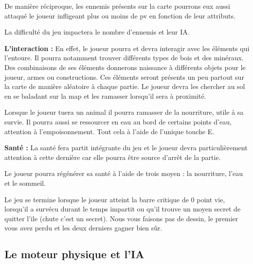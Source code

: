 \documentclass{article}
\begin{document}
\par
 De manière réciproque, les ennemis présents sur la carte pourrons eux aussi attaqué le joueur infligeant plus ou moins de pv en fonction de leur attributs.
\newline

\par 
La difficulté du jeu impactera le nombre d'ennemis et leur IA.
\newline
\newline
\newline
\newline
\par
\textbf{L'interaction :} En effet, le joueur pourra et devra interagir avec les éléments qui l'entoure. Il pourra notamment trouver différents types de bois et des minéraux. Des combinaisons de ses éléments donnerons naissance à différents objets pour le joueur, armes ou constructions. Ces éléments seront présents un peu partout sur la carte de manière aléatoire à chaque partie. Le joueur devra les chercher au sol en se baladant sur la map et les ramasser lorsqu'il sera à proximité. 
\newline
\par 
Lorsque le joueur tuera un animal il pourra ramasser de la nourriture, utile à sa survie. Il pourra aussi se ressourcer en eau au bord de certains points d'eau, attention à l'empoisonnement. Tout cela à l'aide de l'unique touche E.
\newline

\par
\textbf{Santé :} La santé fera partit intégrante du jeu et le joueur devra particulièrement attention à cette dernière car elle pourra être source d'arrêt de la partie.
\newline

\par 
Le joueur pourra régénérer sa santé à l'aide de trois moyen : la nourriture, l'eau et le sommeil.
\newline

\par
Le jeu se termine lorsque le joueur atteint la barre critique de 0 point vie, lorsqu'il a survécu durant le temps impartit ou qu'il trouve un moyen secret de quitter l'ile (chute c'est un secret). Nous vous faisons pas de dessin, le premier vous avez perdu et les deux derniers gagner bien sûr.

\subsection{Le moteur physique et l'IA}
\end{document}
